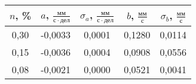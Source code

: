 \begin{tabular}[t]{|c|c|c|c|c|}
\hline
$n$, \% & $a$, $\frac{мм}{с \cdot дел}$ & $\sigma_a$, $\frac{мм}{с \cdot дел}$ & $b$, $\frac{мм}{с}$ & $\sigma_b$, $\frac{мм}{с}$ \\ 
\hline
0,30 & -0,0033 & 0,0001 & 0,1280 & 0,0114 \\ 
0,15 & -0,0036 & 0,0004 & 0,0908 & 0,0556 \\ 
0,08 & -0,0021 & 0,0000 & 0,0521 & 0,0041 \\ 
\hline
\end{tabular}